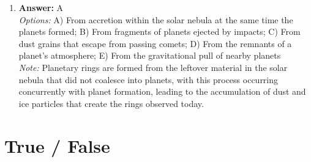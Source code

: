 \documentclass[12pt]{article}
\begin{document}
\begin{enumerate}[label=\arabic*.]
\item \textbf{Answer:} A
\\ \textit{Options:} A) From accretion within the solar nebula at the same time the planets formed; B) From fragments of planets ejected by impacts; C) From dust grains that escape from passing comets; D) From the remnants of a planet's atmosphere; E) From the gravitational pull of nearby planets
\\ \textit{Note:} Planetary rings are formed from the leftover material in the solar nebula that did not coalesce into planets, with this process occurring concurrently with planet formation, leading to the accumulation of dust and ice particles that create the rings observed today.
\end{enumerate}

\section*{True / False}
\end{document}
